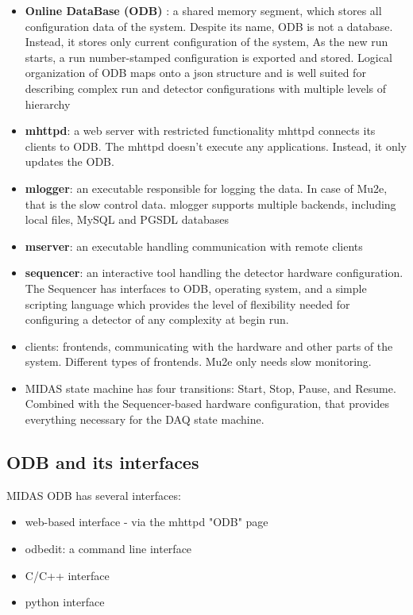 \begin{itemize}
\item
  {\bf Online DataBase (ODB)} : a shared memory segment, which stores all configuration data of the system.
  Despite its name, ODB is not a database. Instead, it stores only current configuration
  of the system, As the new run starts, a run number-stamped configuration is exported and stored.
  Logical organization of ODB maps onto a json structure and is well suited for describing
  complex run and detector configurations with multiple levels of hierarchy
\item 
  {\bf mhttpd}: a web server with restricted functionality
  mhttpd connects its clients to ODB. 
  The mhttpd doesn't execute any applications. Instead, it only updates the ODB.
\item
  {\bf mlogger}: an executable responsible for logging the data. In case of Mu2e, that is the slow control data.
  mlogger supports multiple backends, including local files, MySQL and PGSDL databases
\item
  {\bf mserver}: an executable handling communication with remote clients
\item
  {\bf sequencer}: an interactive tool handling the detector hardware configuration.
  The Sequencer has interfaces to ODB, operating system, and a simple scripting language
  which provides the level of flexibility needed for configuring a detector of any complexity
  at begin run.
\item
  clients: frontends, communicating with the hardware and other
  parts of the system. Different types of frontends. Mu2e only needs slow monitoring.
\item
  MIDAS state machine has four transitions: Start, Stop, Pause, and Resume.
  Combined with the Sequencer-based hardware configuration, that provides everything
  necessary for the DAQ state machine.
\end{itemize}

\subsection{ODB and its interfaces}

MIDAS ODB has several interfaces:
\begin{itemize}
\item 
  web-based interface - via the mhttpd "ODB" page
\item
  odbedit: a command line interface
\item
  C/C++ interface
\item
  python interface
\end{itemize}

